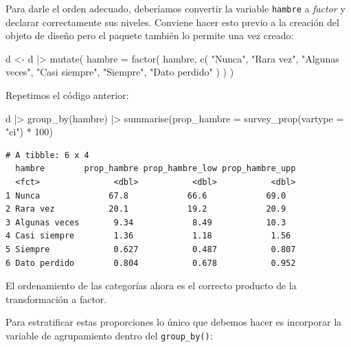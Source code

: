 \documentclass[
  spanish,
  a4paper,
]{scrbook}
\newenvironment{Shaded}{\begin{snugshade}}{\end{snugshade}}
\newcommand{\AttributeTok}[1]{\textcolor[rgb]{0.40,0.45,0.13}{#1}}
\newcommand{\DecValTok}[1]{\textcolor[rgb]{0.68,0.00,0.00}{#1}}
\newcommand{\FunctionTok}[1]{\textcolor[rgb]{0.28,0.35,0.67}{#1}}
\newcommand{\NormalTok}[1]{\textcolor[rgb]{0.00,0.23,0.31}{#1}}
\newcommand{\OtherTok}[1]{\textcolor[rgb]{0.00,0.23,0.31}{#1}}
\newcommand{\SpecialCharTok}[1]{\textcolor[rgb]{0.37,0.37,0.37}{#1}}
\newcommand{\StringTok}[1]{\textcolor[rgb]{0.13,0.47,0.30}{#1}}
\begin{document}
Para darle el orden adecuado, deberíamos convertir la variable
\texttt{hambre} a \emph{factor} y declarar correctamente sus niveles.
Conviene hacer esto previo a la creación del objeto de diseño pero el
paquete también lo permite una vez creado:

\begin{Shaded}
\begin{Highlighting}[]
\NormalTok{d }\OtherTok{\textless{}{-}}\NormalTok{ d }\SpecialCharTok{|\textgreater{}}
  \FunctionTok{mutate}\NormalTok{(}
    \AttributeTok{hambre =} \FunctionTok{factor}\NormalTok{(}
\NormalTok{      hambre,}
      \FunctionTok{c}\NormalTok{(}
        \StringTok{"Nunca"}\NormalTok{,}
        \StringTok{"Rara vez"}\NormalTok{,}
        \StringTok{"Algunas veces"}\NormalTok{,}
        \StringTok{"Casi siempre"}\NormalTok{,}
        \StringTok{"Siempre"}\NormalTok{,}
        \StringTok{"Dato perdido"}
\NormalTok{      )}
\NormalTok{    )}
\NormalTok{  )}
\end{Highlighting}
\end{Shaded}

Repetimos el código anterior:

\begin{Shaded}
\begin{Highlighting}[]
\NormalTok{d }\SpecialCharTok{|\textgreater{}}
  \FunctionTok{group\_by}\NormalTok{(hambre) }\SpecialCharTok{|\textgreater{}}
  \FunctionTok{summarise}\NormalTok{(}\AttributeTok{prop\_hambre =} \FunctionTok{survey\_prop}\NormalTok{(}\AttributeTok{vartype =} \StringTok{"ci"}\NormalTok{) }\SpecialCharTok{*} \DecValTok{100}\NormalTok{)}
\end{Highlighting}
\end{Shaded}

\begin{verbatim}
# A tibble: 6 x 4
  hambre        prop_hambre prop_hambre_low prop_hambre_upp
  <fct>               <dbl>           <dbl>           <dbl>
1 Nunca              67.8            66.6            69.0  
2 Rara vez           20.1            19.2            20.9  
3 Algunas veces       9.34            8.49           10.3  
4 Casi siempre        1.36            1.18            1.56 
5 Siempre             0.627           0.487           0.807
6 Dato perdido        0.804           0.678           0.952
\end{verbatim}

El ordenamiento de las categorías ahora es el correcto producto de la
transformación a factor.

Para estratificar estas proporciones lo único que debemos hacer es
incorporar la variable de agrupamiento dentro del \texttt{group\_by()}:
\end{document}
